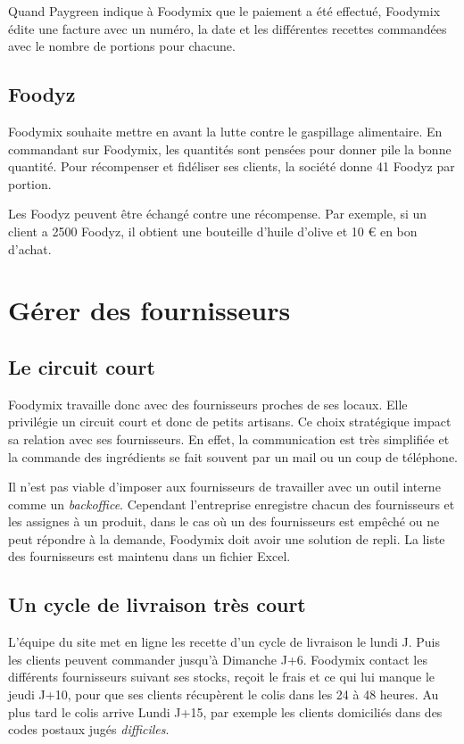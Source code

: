 \documentclass{article}
\begin{document}
Quand Paygreen indique à Foodymix que le paiement a été effectué, Foodymix édite une facture avec un numéro, la date et les différentes recettes commandées avec le nombre de portions pour chacune.

\subsection{Foodyz}
Foodymix souhaite mettre en avant la lutte contre le gaspillage alimentaire. En commandant sur Foodymix, les quantités sont pensées pour donner pile la bonne quantité. Pour récompenser et fidéliser ses clients, la société donne 41 Foodyz par portion.

Les Foodyz peuvent être échangé contre une récompense. Par exemple, si un client a 2500 Foodyz, il obtient une bouteille d'huile d'olive et 10 € en bon d'achat.

\section{Gérer des fournisseurs}
\subsection{Le circuit court}
\label{Sub Fournisseur}
Foodymix travaille donc avec des fournisseurs proches de ses locaux. Elle privilégie un circuit court et donc de petits artisans. Ce choix stratégique impact sa relation avec ses fournisseurs. En effet, la communication est très simplifiée et la commande des ingrédients se fait souvent par un mail ou un coup de téléphone.

Il n'est pas viable d'imposer aux fournisseurs de travailler avec un outil interne comme un \textit{backoffice}. Cependant l'entreprise enregistre chacun des fournisseurs et les assignes à un produit, dans le cas où un des fournisseurs est empêché ou ne peut répondre à la demande, Foodymix doit avoir une solution de repli. La liste des fournisseurs est maintenu dans un fichier Excel.

\subsection{Un cycle de livraison très court}
L'équipe du site met en ligne les recette d'un cycle de livraison le lundi J. Puis les clients peuvent commander jusqu'à Dimanche J+6. Foodymix contact les différents fournisseurs suivant ses stocks, reçoit le frais et ce qui lui manque le jeudi J+10, pour que ses clients récupèrent le colis dans les 24 à 48 heures. Au plus tard le colis arrive Lundi J+15, par exemple les clients domiciliés dans des codes postaux jugés \textit{difficiles}.
\end{document}
